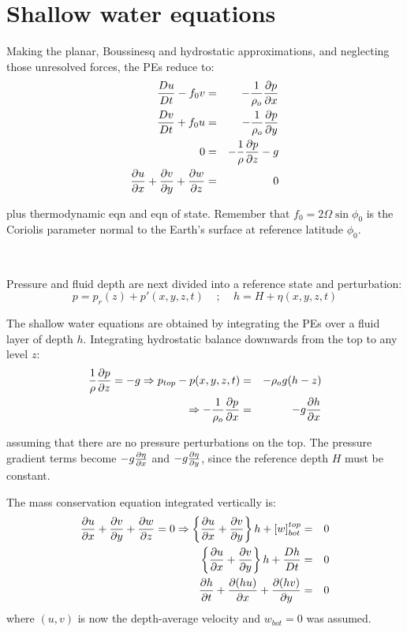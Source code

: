 
\section{Shallow water equations}

Making the planar, Boussinesq and hydrostatic approximations, and neglecting those unresolved forces, 
the PEs reduce to:
\begin{eqnarray}
	\frac{D u}{D t}-f_0 v & = & -\frac{1}{\rho_o}\frac{\partial p}{\partial x} \\
	\frac{D v}{D t}+f_0 u & = & -\frac{1}{\rho_o}\frac{\partial p}{\partial y} \\
	0 & = & - \frac{1}{\rho} \frac{\partial p}{\partial z} - g \\
	\frac{\partial u}{\partial x}+\frac{\partial v}{\partial y}+\frac{\partial w}{\partial z} & = & 0
\end{eqnarray}

plus thermodynamic eqn and eqn of state. Remember that $f_0=2\Omega \sin\phi_0$ is the Coriolis parameter normal to the Earth's surface at
reference latitude $\phi_0$.

~

Pressure and fluid depth are next divided into
a reference state and perturbation:
\begin{equation*}
	p=p_r(z)+p'(x,y,z,t)~~~~~;~~~~~h=H+\eta(x,y,z,t)
\end{equation*}

The shallow water equations are obtained by integrating the PEs
over a fluid layer of depth $h$. Integrating hydrostatic balance
downwards from the top to any level $z$:
\begin{eqnarray*}
	\frac{1}{\rho}\frac{\partial p}{\partial z}=-g \Rightarrow p_{top}-p(x,y,z,t) & = & -\rho_o g (h-z) \\
	\Rightarrow -\frac{1}{\rho_o} \frac{\partial p}{\partial x} & = & -g \frac{\partial h}{\partial x}
\end{eqnarray*}

assuming that there are no pressure perturbations on the top.
The pressure gradient terms become $-g\frac{\partial \eta}{\partial x}$ and
$-g\frac{\partial \eta}{\partial y}$, since the reference depth $H$ must be constant.

The mass conservation equation integrated vertically is:
\begin{eqnarray*}
	\frac{\partial u}{\partial x}+\frac{\partial v}{\partial y}+\frac{\partial w}{\partial z} = 0 \Rightarrow \left\{ \frac{\partial u}{\partial x}+\frac{\partial v}{\partial y} \right\} h+[w]^{top}_{bot} & = & 0 \\
	\left\{ \frac{\partial u}{\partial x}+\frac{\partial v}{\partial y} \right\} h+\frac{D h}{D t} & = & 0 \\
	\frac{\partial h}{\partial t}+\frac{\partial (hu)}{\partial x}+\frac{\partial (hv)}{\partial y} & = & 0
\end{eqnarray*}
where $(u,v)$ is now the depth-average velocity and $w_{bot}=0$ was assumed. 


